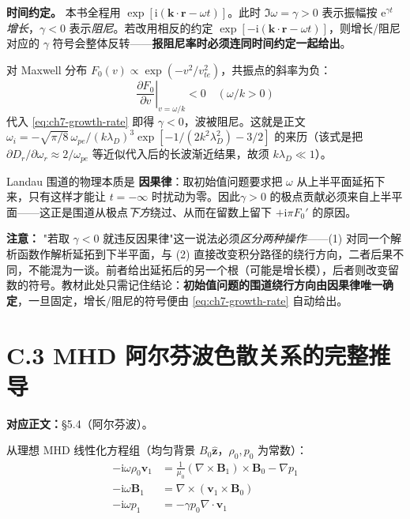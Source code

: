 \documentclass[12pt,a4paper,openany,oneside]{book}
\newcommand{\ii}{\mathrm{i}}
\newcommand{\ee}{\mathrm{e}}
\newcommand{\vect}[1]{\bm{#1}}
\newcommand{\unitvec}[1]{\hat{\vect{#1}}}
\newcommand{\grad}{\nabla}
\newcommand{\curl}{\nabla\times}
\newcommand{\divg}{\nabla\cdot}
\begin{document}
\textbf{时间约定。} 本书全程用 $\exp[\ii(\vect{k}\cdot\vect{r}-\omega t)]$。此时 $\Im\omega=\gamma>0$ 表示振幅按 $\ee^{\gamma t}$ \emph{增长}，$\gamma<0$ 表示\emph{阻尼}。若改用相反的约定 $\exp[-\ii(\vect{k}\cdot\vect{r}-\omega t)]$，则增长/阻尼对应的 $\gamma$ 符号会整体反转——\textbf{报阻尼率时必须连同时间约定一起给出}。

对 Maxwell 分布 $F_0(v)\propto\exp(-v^2/v_{te}^2)$，共振点的斜率为负：
\begin{equation}
\left.\frac{\partial F_0}{\partial v}\right|_{v=\omega/k} < 0 \quad (\omega/k>0)
\label{eq:ch7-landau-condition}
\end{equation}
代入 \eqref{eq:ch7-growth-rate} 即得 $\gamma<0$，波被阻尼。这就是正文 $\omega_i=-\sqrt{\pi/8}\,\omega_{pe}/(k\lambda_D)^3\exp[-1/(2k^2\lambda_D^2)-3/2]$ 的来历（该式是把 $\partial D_r/\partial\omega_r\approx2/\omega_{pe}$ 等近似代入后的长波渐近结果，故须 $k\lambda_D\ll1$）。

\begin{insight}{}{}
Landau 围道的物理本质是 \textbf{因果律}：取初始值问题要求把 $\omega$ 从上半平面延拓下来，只有这样才能让 $t=-\infty$ 时扰动为零。因此$\gamma>0$ 的极点贡献必须来自上半平面——这正是围道从极点\emph{下方}绕过、从而在留数上留下 $+\ii\pi F_0'$ 的原因。

\textbf{注意：} "若取 $\gamma<0$ 就违反因果律"这一说法必须\emph{区分两种操作}——(1) 对同一个解析函数作解析延拓到下半平面，与 (2) 直接改变积分路径的绕行方向，二者后果不同，不能混为一谈。前者给出延拓后的另一个根（可能是增长模），后者则改变留数的符号。教材此处只需记住结论：\textbf{初始值问题的围道绕行方向由因果律唯一确定}，一旦固定，增长/阻尼的符号便由 \eqref{eq:ch7-growth-rate} 自动给出。
\end{insight}


\section{C.3 MHD 阿尔芬波色散关系的完整推导}
\label{sec:alfven-dispersion}

\textbf{对应正文：}\S 5.4（阿尔芬波）。

从理想 MHD 线性化方程组（均匀背景 $B_0\unitvec{z}$，$\rho_0, p_0$ 为常数）：
\begin{align}
-\ii\omega\rho_0\vect{v}_1 &= \frac{1}{\mu_0}(\curl\vect{B}_1)\times\vect{B}_0 - \grad p_1 \label{eq:lin-mom}\\
-\ii\omega\vect{B}_1 &= \curl(\vect{v}_1\times\vect{B}_0) \label{eq:lin-far}\\
-\ii\omega p_1 &= -\gamma p_0\divg\vect{v}_1 \label{eq:lin-eos}
\end{align}
\end{document}
